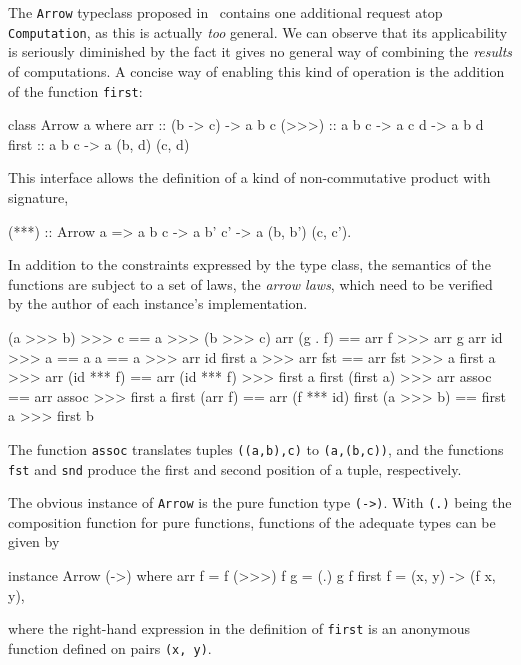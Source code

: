 The \verb|Arrow| typeclass proposed in~\cite{hughes-monad2arr} contains one
additional request atop \linebreak\verb|Computation|, as this is actually
\emph{too} general. We can observe that its applicability is seriously
diminished by the fact it gives no general way of combining the \emph{results}
of computations. A concise way of enabling this kind of operation is the
addition of the function \verb|first|:

\begin{code}
  class Arrow a where
      arr   :: (b -> c) -> a b c
      (>>>) :: a b c -> a c d -> a b d
      first :: a b c -> a (b, d) (c, d)
\end{code}

This interface allows the definition of a kind of non-commutative product with
signature,

\begin{code}
  (***) :: Arrow a => a b c -> a b' c' -> a (b, b') (c, c')\textrm{.}
\end{code}

In addition to the constraints expressed by the type class, the semantics of the
functions are subject to a set of laws, the \emph{arrow laws}, which need to be
verified by the author of each instance's implementation.

\begin{code}[numbers=left]
                (a >>> b) >>> c == a >>> (b >>> c)
                    arr (g . f) == arr f >>> arr g
                   arr id >>> a == a
                              a == a >>> arr id
            first a >>> arr fst == arr fst >>> a
     first a >>> arr (id *** f) == arr (id *** f) >>> first a
  first (first a) >>> arr assoc == arr assoc >>> first a
                  first (arr f) == arr (f *** id)
                first (a >>> b) == first a >>> first b
\end{code}

The function \verb|assoc| translates tuples \verb|((a,b),c)| to
\verb|(a,(b,c))|, and the functions \verb|fst| and \verb|snd| produce the first
and second position of a tuple, respectively.

The obvious instance of \verb|Arrow| is the pure function type \verb|(->)|. With
\verb|(.)| being the composition function for pure functions, functions of the
adequate types can be given by

\begin{code}
  instance Arrow (->) where
      arr f     = f
      (>>>) f g = (.) g f
      first f   = (x, y) -> (f x, y)\textrm{,}
\end{code}

where the right-hand expression in the definition of \verb|first| is an
anonymous function defined on pairs \verb|(x, y)|.

